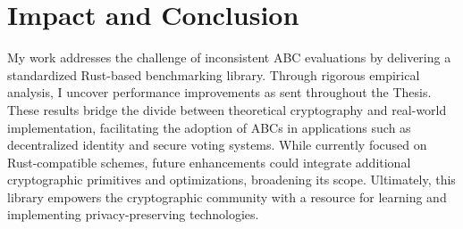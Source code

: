 \section{Impact and Conclusion}

My work addresses the challenge of inconsistent ABC evaluations by delivering a standardized Rust-based benchmarking library. Through rigorous empirical analysis, I uncover performance improvements as sent throughout the Thesis. These results bridge the divide between theoretical cryptography and real-world implementation, facilitating the adoption of ABCs in applications such as decentralized identity and secure voting systems. While currently focused on Rust-compatible schemes, future enhancements could integrate additional cryptographic primitives and optimizations, broadening its scope. Ultimately, this library empowers the cryptographic community with a resource for learning and implementing privacy-preserving technologies.




